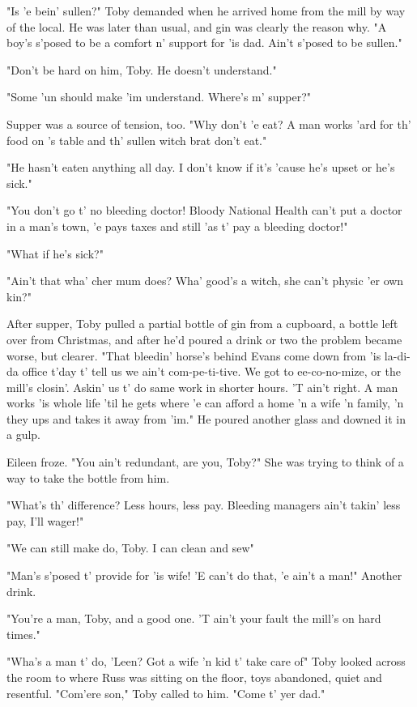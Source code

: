 "Is 'e bein' sullen?" Toby demanded when he arrived home from the mill by way of the local. He was later than usual, and gin was clearly the reason why. "A boy's s'posed to be a comfort n' support for 'is dad. Ain't s'posed to be sullen."

"Don't be hard on him, Toby. He doesn't understand."

"Some 'un should make 'im understand. Where's m' supper?"

Supper was a source of tension, too. "Why don't 'e eat? A man works 'ard for th' food on 's table and th' sullen witch brat don't eat."

"He hasn't eaten anything all day. I don't know if it's 'cause he's upset or he's sick."

"You don't go t' no bleeding doctor! Bloody National Health can't put a doctor in a man's town, 'e pays taxes and still 'as t' pay a bleeding doctor!"

"What if he's sick?"

"Ain't that wha' cher mum does? Wha' good's a witch, she can't physic 'er own kin?"

After supper, Toby pulled a partial bottle of gin from a cupboard, a bottle left over from Christmas, and after he'd poured a drink or two the problem became worse, but clearer. "That bleedin' horse's behind Evans come down from 'is la-di-da office t'day t' tell us we ain't com-pe-ti-tive. We got to ee-co-no-mize, or the mill's closin'. Askin' us t' do same work in shorter hours. 'T ain't right. A man works 'is whole life 'til he gets where 'e can afford a home 'n a wife 'n family, 'n they ups and takes it away from 'im." He poured another glass and downed it in a gulp.

Eileen froze. "You ain't redundant, are you, Toby?" She was trying to think of a way to take the bottle from him.

"What's th' difference? Less hours, less pay. Bleeding managers ain't takin' less pay, I'll wager!"

"We can still make do, Toby. I can clean and sew{\el}"

"Man's s'posed t' provide for 'is wife! 'E can't do that, 'e ain't a man!" Another drink.

"You're a man, Toby, and a good one. 'T ain't your fault the mill's on hard times."

"Wha's a man t' do, 'Leen? Got a wife 'n kid t' take care of{\el}" Toby looked across the room to where Russ was sitting on the floor, toys abandoned, quiet and resentful. "Com'ere son," Toby called to him. "Come t' yer dad."

